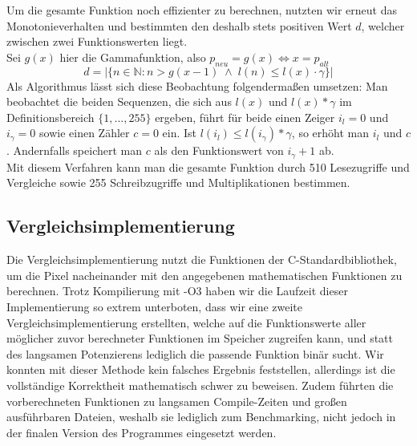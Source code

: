 \documentclass[course=erap]{aspdoc}
\begin{document}
	\noindent
	Um die gesamte Funktion noch effizienter zu berechnen, nutzten wir erneut das Monotonieverhalten und bestimmten den deshalb stets positiven Wert $d$, welcher zwischen zwei Funktionswerten liegt.\\
	Sei $g(x)$ hier die Gammafunktion, also $p_{neu}=g(x) \iff x = p_{alt}$
	\begin{equation}
	\label{(7)}
	    d= |\{n\in \mathbb{N} : n>g(x-1) \;\wedge\; l(n)\leq l(x)\cdot \gamma\}|
	\end{equation}
	Als Algorithmus lässt sich diese Beobachtung folgendermaßen umsetzen: Man beobachtet die beiden Sequenzen, die sich aus $l(x)$ und $l(x)*\gamma$ im Definitionsbereich $\{1,...,255\}$ ergeben, führt für beide einen Zeiger $i_{l} = 0$ und $i_{\gamma} = 0$ sowie einen Zähler $c = 0$ ein.
	Ist $l(i_{l})\leq l(i_{\gamma})*\gamma$, so erhöht man $i_{l}$ und $c$. Andernfalls speichert man $c$ als den Funktionswert von $i_{\gamma}+1$ ab.\\
	Mit diesem Verfahren kann man die gesamte Funktion durch 510 Lesezugriffe und Vergleiche sowie 255 Schreibzugriffe und Multiplikationen bestimmen.
	
	\subsection{Vergleichsimplementierung}
	Die Vergleichsimplementierung nutzt die Funktionen der C-Standardbibliothek, um die Pixel nacheinander mit den angegebenen mathematischen Funktionen zu berechnen. Trotz Kompilierung mit -O3 haben wir die Laufzeit dieser Implementierung so extrem unterboten, dass wir eine zweite Vergleichsimplementierung erstellten, welche auf die Funktionswerte aller möglicher zuvor berechneter Funktionen im Speicher zugreifen kann, und statt des langsamen Potenzierens lediglich die passende Funktion binär sucht. Wir konnten mit dieser Methode kein falsches Ergebnis feststellen, allerdings ist die vollständige Korrektheit mathematisch schwer zu beweisen.
	Zudem führten die vorberechneten Funktionen  zu langsamen Compile-Zeiten und großen ausführbaren Dateien, weshalb sie lediglich zum Benchmarking, nicht jedoch in der finalen Version des Programmes eingesetzt werden.
	
\end{document}
